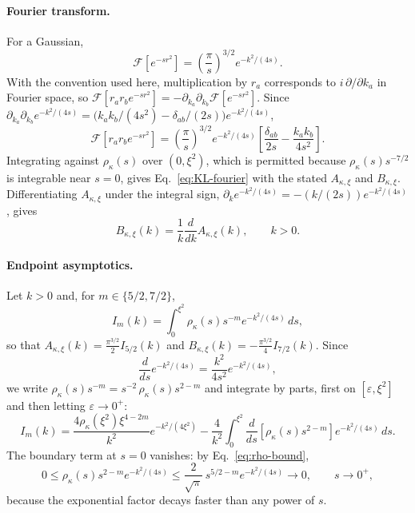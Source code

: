 \documentclass[11pt]{article}
\theoremstyle{plain}
\DeclareRobustCommand{\_}{\textunderscore\allowbreak}
\begin{document}
\paragraph{Fourier transform.}
For a Gaussian,
\begin{equation}
\mathcal F[e^{-sr^2}]
=
\left(\frac{\pi}{s}\right)^{3/2}
e^{-k^2/(4s)}.
\end{equation}
With the convention used here, multiplication by $r_a$ corresponds to
$i\,\partial/\partial k_a$ in Fourier space, so
$\mathcal F[r_ar_b e^{-sr^2}]
=-\partial_{k_a}\partial_{k_b}\mathcal F[e^{-sr^2}]$. Since
$\partial_{k_a}\partial_{k_b}e^{-k^2/(4s)}
=\bigl(k_ak_b/(4s^2)-\delta_{ab}/(2s)\bigr)e^{-k^2/(4s)}$,
\begin{equation}
\mathcal F[
r_a r_b e^{-sr^2}
]
=
\left(\frac{\pi}{s}\right)^{3/2}
e^{-k^2/(4s)}
\left[
\frac{\delta_{ab}}{2s}
-
\frac{k_a k_b}{4s^2}
\right].
\end{equation}
Integrating against $\rho_\kappa(s)$ over $(0,\xi^2)$, which is permitted
because $\rho_\kappa(s)s^{-7/2}$ is integrable near $s=0$, gives
Eq.~\eqref{eq:KL-fourier} with the stated $A_{\kappa,\xi}$ and
$B_{\kappa,\xi}$. Differentiating $A_{\kappa,\xi}$ under the integral
sign, $\partial_k e^{-k^2/(4s)}=-(k/(2s))e^{-k^2/(4s)}$, gives
\begin{equation}
B_{\kappa,\xi}(k)
=
\frac{1}{k}
\frac{d}{dk}A_{\kappa,\xi}(k),
\qquad
k>0.
\end{equation}

\paragraph{Endpoint asymptotics.}
Let $k>0$ and, for $m\in\{5/2,7/2\}$,
\begin{equation}
I_m(k)
=
\int_0^{\xi^2}
\rho_\kappa(s)s^{-m}e^{-k^2/(4s)}\,ds,
\end{equation}
so that $A_{\kappa,\xi}(k)=\tfrac{\pi^{3/2}}{2}I_{5/2}(k)$ and
$B_{\kappa,\xi}(k)=-\tfrac{\pi^{3/2}}{4}I_{7/2}(k)$. Since
\begin{equation}
\frac{d}{ds}e^{-k^2/(4s)}
=
\frac{k^2}{4s^2}e^{-k^2/(4s)},
\end{equation}
we write $\rho_\kappa(s)s^{-m}=s^{-2}\,\rho_\kappa(s)s^{2-m}$ and integrate
by parts, first on $[\varepsilon,\xi^2]$ and then letting
$\varepsilon\to0^+$:
\begin{equation}
\label{eq:Im-ibp}
I_m(k)
=
\frac{4\rho_\kappa(\xi^2)\xi^{4-2m}}{k^2}
e^{-k^2/(4\xi^2)}
-
\frac{4}{k^2}
\int_0^{\xi^2}
\frac{d}{ds}\!\left[\rho_\kappa(s)s^{2-m}\right]
e^{-k^2/(4s)}\,ds .
\end{equation}
The boundary term at $s=0$ vanishes: by Eq.~\eqref{eq:rho-bound},
\begin{equation}
0
\le
\rho_\kappa(s)s^{2-m}e^{-k^2/(4s)}
\le
\frac{2}{\sqrt{\pi}}\,s^{5/2-m}e^{-k^2/(4s)}
\longrightarrow0,
\qquad s\to0^+,
\end{equation}
because the exponential factor decays faster than any power of $s$.
\end{document}
